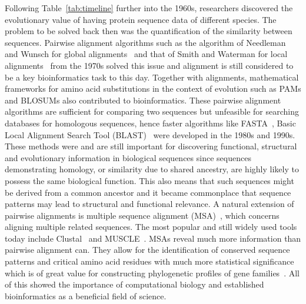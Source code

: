 Following Table~\ref{tab:timeline} further into the 1960s, researchers discovered the evolutionary value of having protein sequence data of different species. The problem to be solved back then was the quantification of the similarity between sequences. Pairwise alignment algorithms such as the algorithm of Needleman and Wunsch for global alignments~\cite{global} and that of Smith and Waterman for local alignments~\cite{local} from the 1970s solved this issue and alignment is still considered to be a key bioinformatics task to this day. Together with alignments, mathematical frameworks for amino acid substitutions in the context of evolution such as PAMs and BLOSUMs also contributed to bioinformatics. These pairwise alignment algorithms are sufficient for comparing two sequences but unfeasible for searching databases for homologous sequences, hence faster algorithms like FASTA~\cite{fasta}, Basic Local Alignment Search Tool (BLAST)~\cite{blast} were developed in the 1980s and 1990s. These methods were and are still important for discovering functional, structural and evolutionary information in biological sequences since sequences demonstrating homology, or similarity due to shared ancestry, are highly likely to possess the same biological function. This also means that such sequences might be derived from a common ancestor and it became commonplace that sequence patterns may lead to structural and functional relevance. A natural extension of pairwise alignments is multiple sequence alignment (MSA)~\cite{msa}, which concerns aligning multiple related sequences. The most popular and still widely used tools today include Clustal~\cite{clustal} and MUSCLE~\cite{muscle}. MSAs reveal much more information than pairwise alignment can. They allow for the identification of conserved sequence patterns and critical amino acid residues with much more statistical significance which is of great value for constructing phylogenetic profiles of gene families~\cite{phylo}. All of this showed the importance of computational biology and established bioinformatics as a beneficial field of science.

